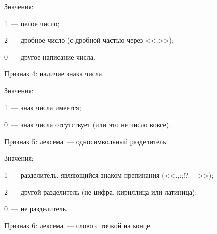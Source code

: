    Значения: 


   


   1~---  целое число; 


   


   2~---  дробное число (с дробной частью через <<.>>); 


   


   0~---   другое написание числа.


   


   


   \smallskip


   


   Признак 4: наличие знака числа. 


   


   Значения: 


   


   1~---  знак числа имеется; 


   


   0~---  знак числа отсутствует (или это не число вовсе).


   


   \smallskip


   Признак 5: лексема~--- односимвольный разделитель. 


   


   Значения: 


   


   1~---  разделитель, являющийся знаком препинания (<<.,:;!?--- >>); 


   


   2~---  другой разделитель (не цифра, кириллица или латиница);


   


   0~---  не разделитель.


   


   \smallskip


   


   Признак 6: лексема~--- слово с точкой на конце. 


